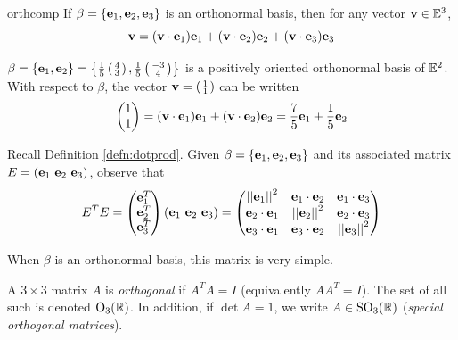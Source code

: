 \begin{lemm}{}{orthcomp}
If $\beta=\{\ve_1,\ve_2,\ve_3\}$ is an orthonormal basis, then for any vector $\vv\in\E^3$,
	\[\vv=(\vv\cdot\ve_1)\ve_1+(\vv\cdot\ve_2)\ve_2+(\vv\cdot\ve_3)\ve_3\]
\end{lemm}

\begin{example}{}{}
$\beta=\{\ve_1,\ve_2\}=\left\{\frac 15\stwovec 43,\frac 15\stwovec{-3}4\right\}$ is a positively oriented orthonormal basis of $\E^2$. With respect to $\beta$, the vector $\vv=\stwovec 11$ can be written
\[\twovec 11=(\vv\cdot\ve_1)\ve_1 +(\vv\cdot\ve_2)\ve_2 =\frac 75\ve_1+\frac 15\ve_2\]
\end{example}


Recall Definition \ref{defn:dotprod}. Given $\beta=\{\ve_1,\ve_2,\ve_3\}$ and its associated matrix $E=(\ve_1\ \ve_2\ \ve_3)$, observe that
\[E^TE=\begin{pmatrix}
\ve_1^T\\
\ve_2^T\\
\ve_3^T
\end{pmatrix}(\ve_1\ \ve_2\ \ve_3)
=\begin{pmatrix}
\Nm{\ve_1}^2&\ve_1\cdot\ve_2&\ve_1\cdot \ve_3\\
\ve_2\cdot\ve_1&\Nm{\ve_2}^2&\ve_2\cdot \ve_3\\
\ve_3\cdot\ve_1&\ve_3\cdot \ve_2&\Nm{\ve_3}^2
\end{pmatrix}\]

When $\beta$ is an orthonormal basis, this matrix is very simple.

\begin{defn}{}{}
A $3\times 3$ matrix $A$ is \emph{orthogonal} if $A^TA=I$ (equivalently $AA^T=I$). The set of all such is denoted $\rO_3(\R)$. In addition, if $\det A=1$, we write $A\in \rSO_3(\R)$ (\emph{special orthogonal matrices}).
\end{defn}

